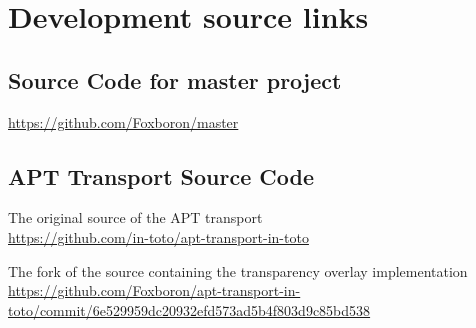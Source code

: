 \documentclass[../Main/thesis.tex]{subfiles}
\begin{document}
\chapter{Development source links}%
\label{appendix:apt-development-source}

\section{Source Code for master project}%
\label{sec:source_code_master}
\url{https://github.com/Foxboron/master}

\section{APT Transport Source Code}%
\label{sec:apt_transport_source_code}
The original source of the APT transport\\
\url{https://github.com/in-toto/apt-transport-in-toto}

The fork of the source containing the transparency overlay implementation\\
\url{https://github.com/Foxboron/apt-transport-in-toto/commit/6e529959dc20932efd573ad5b4f803d9c85bd538}
\end{document}
